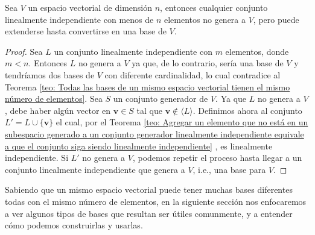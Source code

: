 \documentclass[notasLineal]{subfiles}
\begin{document}
\begin{Teo}\label{teo: Conversión de conjunto linealmente independiente en base para espacios de dimensión finita}
Sea $V$ un espacio vectorial de dimensión $n$, entonces cualquier conjunto linealmente independiente con menos de $n$ elementos no genera a $V$, pero puede extenderse hasta convertirse en una base de $V$.

\begin{proof}
    Sea $L$ un conjunto linealmente independiente con $m$ elementos, donde $m<n$. Entonces $L$ no genera a $V$ ya que, de lo contrario, sería una base de $V$ y tendríamos dos bases de $V$ con diferente cardinalidad, lo cual contradice al Teorema \ref{teo: Todas las bases de un mismo espacio vectorial tienen el mismo número de elementos}. Sea $S$ un conjunto generador de $V$. Ya que $L$ no genera a $V$, debe haber algún vector en $\mathbf{v}\in S$ tal que $\mathbf{v}\notin \langle L \rangle$. Definimos ahora al conjunto $L'=L\cup \{\mathbf{v}\}$ el cual, por el Teorema \ref{teo: Agregar un elemento que no está en un subespacio generado a un conjunto generador linealmente independiente equivale a que el conjunto siga siendo linealmente independiente} , es linealmente independiente. Si $L'$ no genera a $V$, podemos repetir el proceso hasta llegar a un conjunto linealmente independiente que genera a $V$, i.e., una base para $V$.
\end{proof}

\end{Teo}

Sabiendo que un mismo espacio vectorial puede tener muchas bases diferentes \textemdash todas con el mismo número de elementos\textemdash \hspace{1mm}, en la siguiente sección nos enfocaremos a ver algunos tipos de bases que resultan ser útiles comunmente, y a entender cómo podemos construirlas y usarlas. 
\end{document}
